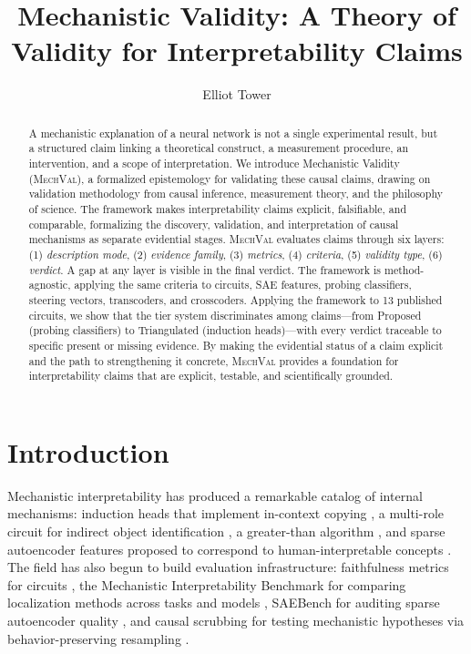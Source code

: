 \documentclass[10pt]{article}
\title{Mechanistic Validity: A Theory of Validity for Interpretability Claims}
\author[1]{Elliot Tower}
\affil[1]{Independent Researcher, \texttt{elliot@elliottower.ai}}
\date{}
\newcommand{\mechval}{\textsc{MechVal}}
\begin{document}
\maketitle

\begin{abstract}
A mechanistic explanation of a neural network is not a single experimental result, but a structured claim linking a theoretical construct, a measurement procedure, an intervention, and a scope of interpretation. We introduce Mechanistic Validity (\mechval{}), a formalized epistemology for validating these causal claims, drawing on validation methodology from causal inference, measurement theory, and the philosophy of science. The framework makes interpretability claims explicit, falsifiable, and comparable, formalizing the discovery, validation, and interpretation of causal mechanisms as separate evidential stages. \mechval{} evaluates claims through six layers: (1) \emph{description mode}, (2) \emph{evidence family}, (3) \emph{metrics}, (4) \emph{criteria}, (5) \emph{validity type}, (6) \emph{verdict}. A gap at any layer is visible in the final verdict. The framework is method-agnostic, applying the same criteria to circuits, SAE features, probing classifiers, steering vectors, transcoders, and crosscoders. Applying the framework to 13 published circuits, we show that the tier system discriminates among claims---from Proposed (probing classifiers) to Triangulated (induction heads)---with every verdict traceable to specific present or missing evidence. By making the evidential status of a claim explicit and the path to strengthening it concrete, \mechval{} provides a foundation for interpretability claims that are explicit, testable, and scientifically grounded.
\end{abstract}

\section{Introduction}
\label{sec:intro}

Mechanistic interpretability has produced a remarkable catalog of internal mechanisms:
induction heads that implement in-context copying \citep{olsson2022context}, a multi-role
circuit for indirect object identification \citep{wang2023interpretability}, a greater-than
algorithm \citep{hanna2023greater}, and sparse autoencoder features proposed to correspond
to human-interpretable concepts \citep{cunningham2023sparse}. The field has also begun to
build evaluation infrastructure: faithfulness metrics for circuits
\citep{miller2024transformer}, the Mechanistic Interpretability Benchmark for comparing
localization methods across tasks and models \citep{mueller2025mib}, SAEBench for auditing
sparse autoencoder quality \citep{karvonen2025saebench}, and causal scrubbing for testing
mechanistic hypotheses via behavior-preserving resampling \citep{chan2022causal}.
\end{document}
